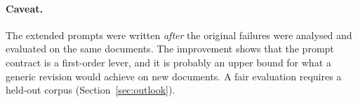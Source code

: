 \begin{table}[t]
\centering\small
\caption{Second revision of the prompt (v3; elasticity and Stokes only, HTML). \cmark\ correct, $\sim$ valid but not equivalent, \xmark\ rejected; ``ran'' and ``exact'' count documents whose solver compiled and ran, and whose output equals the gold output.}
\label{tab:v3}

\end{table}

\paragraph{Caveat.} The extended prompts were written \emph{after} the original failures were analysed and evaluated on the same documents. The improvement shows that the prompt contract is a first-order lever, and it is probably an upper bound for what a generic revision would achieve on new documents. A fair evaluation requires a held-out corpus (Section~\ref{sec:outlook}).

